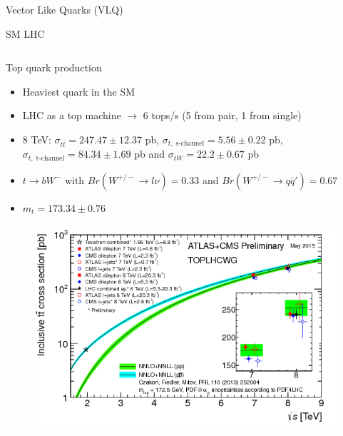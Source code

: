 \begin{frame}{Vector Like Quarks (VLQ)}
\end{frame}

\begin{frame}{SM \@ LHC}
\vspace{-.3cm}
\begin{columns}

\begin{column}{.50\textwidth}
\begin{block}{Top quark production}
\begin{itemize}\tiny
\item Heaviest quark in the SM 
\item LHC as a top machine $\to$ 6 tops/s (5 from pair, 1 from single)
\item 8 TeV: $\sigma_{t\bar{t}}=247.47\pm12.37$ pb, $\sigma_{t,\; \text{s-channel}}=5.56\pm0.22$ pb, $\sigma_{t,\; \text{t-channel}}=84.34\pm1.69$ pb and $\sigma_{tW}=22.2\pm0.67$ pb
\item $t\to bW^{-}$ with $Br(W^{+/-}\to l\nu)=0.33$ and $Br(W^{+/-}\to q\bar{q}')=0.67$
\item $m_{t}=173.34\pm 0.76$ \GeVcc
\end{itemize}
\end{block}

\vspace{-.4cm}
\begin{figure}[!Hhtbp]
  \begin{center}
    \includegraphics[width=1.0\textwidth]{../figs/toplhcwg_ttxsec_sqrts_may2015.png}
  \end{center}
\end{figure}
\end{column}


\end{columns}
\end{frame}
